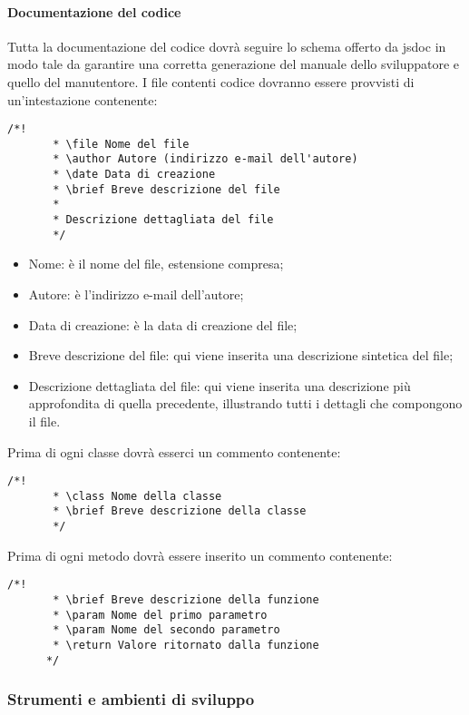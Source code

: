    \paragraph{Documentazione del codice}
     Tutta la documentazione del codice dovrà seguire lo schema offerto da jsdoc in modo tale da garantire
     una corretta generazione del manuale dello sviluppatore e quello del manutentore.
     I file contenti codice dovranno essere provvisti di un'intestazione contenente:
     \begin{lstlisting}[frame=single]
       /*!
       * \file Nome del file
       * \author Autore (indirizzo e-mail dell'autore)
       * \date Data di creazione
       * \brief Breve descrizione del file
       *
       * Descrizione dettagliata del file
       */
     \end{lstlisting}
     \begin{itemize}
     \item Nome: è il nome del file, estensione compresa;
     \item Autore: è l'indirizzo e-mail dell'autore;
     \item Data di creazione: è la data di creazione del file;
     \item Breve descrizione del file: qui viene inserita una descrizione sintetica del file;
     \item Descrizione dettagliata del file: qui viene inserita una descrizione più approfondita di quella precedente, illustrando tutti i dettagli che compongono il file.
     \end{itemize}
     Prima di ogni classe dovrà esserci un commento contenente:
     \begin{lstlisting}[frame=single]
       /*!
       * \class Nome della classe
       * \brief Breve descrizione della classe
       */
     \end{lstlisting}

     Prima di ogni metodo dovrà essere inserito un commento contenente:
     \begin{lstlisting}[frame=single]
       /*!
       * \brief Breve descrizione della funzione
       * \param Nome del primo parametro
       * \param Nome del secondo parametro
       * \return Valore ritornato dalla funzione
      */
  \end{lstlisting}

\subsubsection{Strumenti e ambienti di sviluppo}
